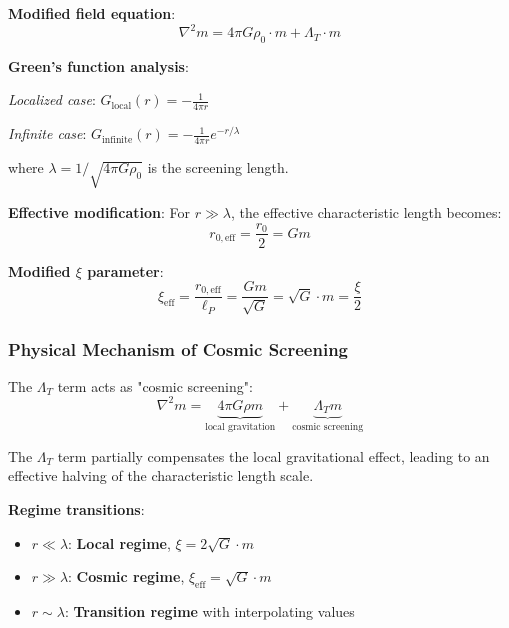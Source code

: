 \documentclass[12pt,a4paper]{article}
\begin{document}
	\textbf{Modified field equation}:
	\begin{equation}
		\nabla^2 m = 4\pi G \rho_0 \cdot m + \Lambda_T \cdot m
	\end{equation}
	
	\textbf{Green's function analysis}:
	
	\textit{Localized case}: $G_{\text{local}}(r) = -\frac{1}{4\pi r}$
	
	\textit{Infinite case}: $G_{\text{infinite}}(r) = -\frac{1}{4\pi r} e^{-r/\lambda}$
	
	where $\lambda = 1/\sqrt{4\pi G \rho_0}$ is the screening length.
	
	\textbf{Effective modification}: For $r \gg \lambda$, the effective characteristic length becomes:
	\begin{equation}
		r_{0,\text{eff}} = \frac{r_0}{2} = Gm
	\end{equation}
	
	\textbf{Modified $\xi$ parameter}:
	\begin{equation}
		\boxed{\xi_{\text{eff}} = \frac{r_{0,\text{eff}}}{\ell_P} = \frac{Gm}{\sqrt{G}} = \sqrt{G} \cdot m = \frac{\xi}{2}}
	\end{equation}
	
	\subsubsection{Physical Mechanism of Cosmic Screening}
	\label{subsubsec:cosmic_screening}
	
	\begin{tcolorbox}[colback=blue!5!white,colframe=blue!75!black,title=Cosmic Screening Mechanism]
		The $\Lambda_T$ term acts as "cosmic screening":
		\begin{equation}
			\nabla^2 m = \underbrace{4\pi G \rho m}_{\text{local gravitation}} + \underbrace{\Lambda_T m}_{\text{cosmic screening}}
		\end{equation}
		
		The $\Lambda_T$ term partially compensates the local gravitational effect, leading to an effective halving of the characteristic length scale.
	\end{tcolorbox}
	
	\textbf{Regime transitions}:
	\begin{itemize}
		\item $r \ll \lambda$: \textbf{Local regime}, $\xi = 2\sqrt{G} \cdot m$
		\item $r \gg \lambda$: \textbf{Cosmic regime}, $\xi_{\text{eff}} = \sqrt{G} \cdot m$
		\item $r \sim \lambda$: \textbf{Transition regime} with interpolating values
	\end{itemize}
	
\end{document}
